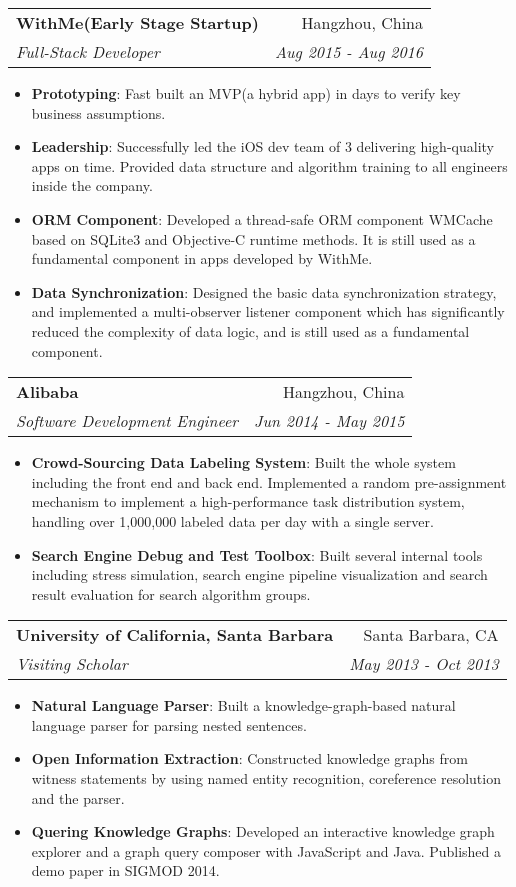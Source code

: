 \documentclass[letterpaper,9pt]{article}
\makeatletter
\newcommand{\resumeItem}[2]{
  \item\small{
    \textbf{#1}{: #2 \vspace{-2pt}}
  }
}
\newcommand{\resumeSubheading}[4]{
  \vspace{-1pt}\item
    \begin{tabular*}{0.97\textwidth}{l@{\extracolsep{\fill}}r}
      \textbf{#1} & #2 \\
      \textit{\small#3} & \textit{\small #4} \\
    \end{tabular*}\vspace{-5pt}
}
\newcommand{\resumeItemListStart}{\begin{itemize}}
\newcommand{\resumeItemListEnd}{\end{itemize}\vspace{-5pt}}
\makeatother
\begin{document}
    \resumeSubheading
      {WithMe(Early Stage Startup)}{Hangzhou, China}
      {Full-Stack Developer}{Aug 2015 - Aug 2016}
      \resumeItemListStart
        \resumeItem{Prototyping}
          {Fast built an MVP(a hybrid app) in days to verify key business assumptions.}
        \resumeItem{Leadership}
          {Successfully led the iOS dev team of 3 delivering high-quality apps on time. Provided data structure and  algorithm training to all engineers inside the company.}
        \resumeItem{ORM Component}
          {Developed a thread-safe ORM component WMCache based on SQLite3 and Objective-C runtime methods. It is still used as a fundamental component in apps developed by WithMe.}
        \resumeItem{Data Synchronization}
          {Designed the basic data synchronization strategy, and implemented a multi-observer listener component which has significantly reduced the complexity of data logic, and is still used as a fundamental component.}
      \resumeItemListEnd

    \resumeSubheading
      {Alibaba}{Hangzhou, China}
      {Software Development Engineer}{Jun 2014 - May 2015}
      \resumeItemListStart
        \resumeItem{Crowd-Sourcing Data Labeling System}
          {Built the whole system including the front end and back end. Implemented a random pre-assignment mechanism to implement a high-performance task distribution system, handling over 1,000,000 labeled data per day with a single server.}
        \resumeItem{Search Engine Debug and Test Toolbox}
          {Built several internal tools including stress simulation, search engine pipeline visualization and search result evaluation for search algorithm groups. }
      \resumeItemListEnd

    \resumeSubheading
      {University of California, Santa Barbara}{Santa Barbara, CA}
      {Visiting Scholar}{May 2013 - Oct 2013}
      \resumeItemListStart
        \resumeItem{Natural Language Parser}
          {Built a knowledge-graph-based natural language parser for parsing nested sentences.}
        \resumeItem{Open Information Extraction}
          {Constructed knowledge graphs from witness statements by using named entity recognition, coreference resolution and the parser.}
        \resumeItem{Quering Knowledge Graphs}
          {Developed an interactive knowledge graph explorer and a graph query composer with JavaScript and Java. Published a demo paper in SIGMOD 2014.}
      \resumeItemListEnd
\end{document}
